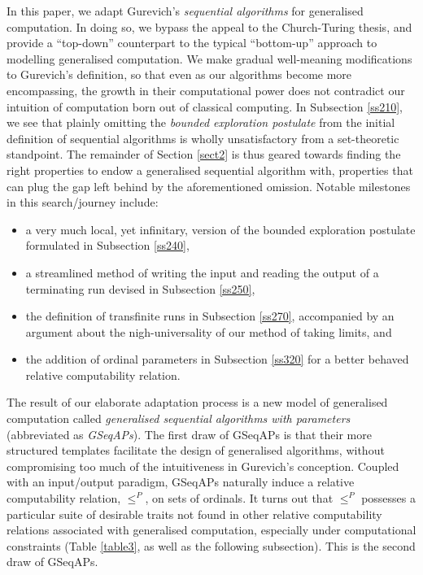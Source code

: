 \documentclass[12pt]{article}
\numberwithin{equation}{section}
\begin{document}
In this paper, we adapt Gurevich's \textit{sequential algorithms} for generalised computation. In doing so, we bypass the appeal to the Church-Turing thesis, and provide a ``top-down'' counterpart to the typical ``bottom-up'' approach to modelling generalised computation. We make gradual well-meaning modifications to Gurevich's definition, so that even as our algorithms become more encompassing, the growth in their computational power does not contradict our intuition of computation born out of classical computing. In Subsection \ref{ss210}, we see that plainly omitting the \textit{bounded exploration postulate} from the initial definition of sequential algorithms is wholly unsatisfactory from a set-theoretic standpoint. The remainder of Section \ref{sect2} is thus geared towards finding the right properties to endow a generalised sequential algorithm with, properties that can plug the gap left behind by the aforementioned omission. Notable milestones in this search/journey include:
\begin{itemize}
    \item a very much local, yet infinitary, version of the bounded exploration postulate formulated in Subsection \ref{ss240},
    \item a streamlined method of writing the input and reading the output of a terminating run devised in Subsection \ref{ss250},
    \item the definition of transfinite runs in Subsection \ref{ss270}, accompanied by an argument about the nigh-universality of our method of taking limits, and
    \item the addition of ordinal parameters in Subsection \ref{ss320} for a better behaved relative computability relation.
\end{itemize}

The result of our elaborate adaptation process is a new model of generalised computation called \textit{generalised sequential algorithms with parameters} (abbreviated as \textit{GSeqAPs}). The first draw of GSeqAPs is that their more structured templates facilitate the design of generalised algorithms, without compromising too much of the intuitiveness in Gurevich's conception. Coupled with an input/output paradigm, GSeqAPs naturally induce a relative computability relation, $\leq^P$, on sets of ordinals. It turns out that $\leq^P$ possesses a particular suite of desirable traits not found in other relative computability relations associated with generalised computation, especially under computational constraints (Table \ref{table3}, as well as the following subsection). This is the second draw of GSeqAPs. 
\end{document}
